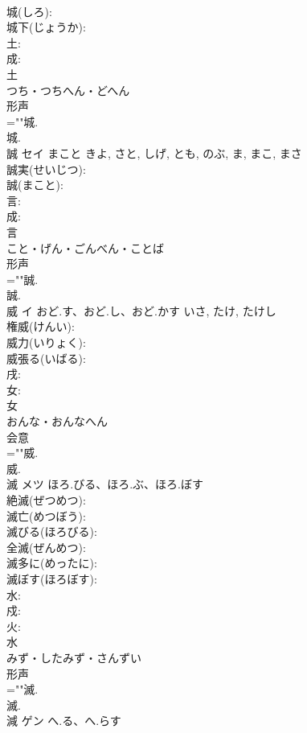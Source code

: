 \documentclass[8pt]{extreport}
\begin{document}
\begin{CJK}{UTF8}{min}
\\	城(しろ): 
\\	城下(じょうか): 
\\	土: 
\\	成: 
\\	土	
\\	つち・つちへん・どへん	
\\	形声 
\\	=""城.
\\	城.
\\	誠	セイ	まこと	きよ, さと, しげ, とも, のぶ, ま, まこ, まさ	
\\	誠実(せいじつ): 
\\	誠(まこと): 
\\	言: 
\\	成: 
\\	言	
\\	こと・げん・ごんべん・ことば	
\\	形声 
\\	=""誠.
\\	誠.
\\	威	イ	おど.す、おど.し、おど.かす	いさ, たけ, たけし	
\\	権威(けんい): 
\\	威力(いりょく): 
\\	威張る(いばる): 
\\	戌: 
\\	女: 
\\	女	
\\	おんな・おんなへん	
\\	会意 
\\	=""威.
\\	威.
\\	滅	メツ	ほろ.びる、ほろ.ぶ、ほろ.ぼす		
\\	絶滅(ぜつめつ): 
\\	滅亡(めつぼう): 
\\	滅びる(ほろびる): 
\\	全滅(ぜんめつ): 
\\	滅多に(めったに): 
\\	滅ぼす(ほろぼす): 
\\	水: 
\\	戍: 
\\	火: 
\\	水	
\\	みず・したみず・さんずい	
\\	形声 
\\	=""滅.
\\	滅.
\\	減	ゲン	へ.る、へ.らす		

\end{CJK}
\end{document}
